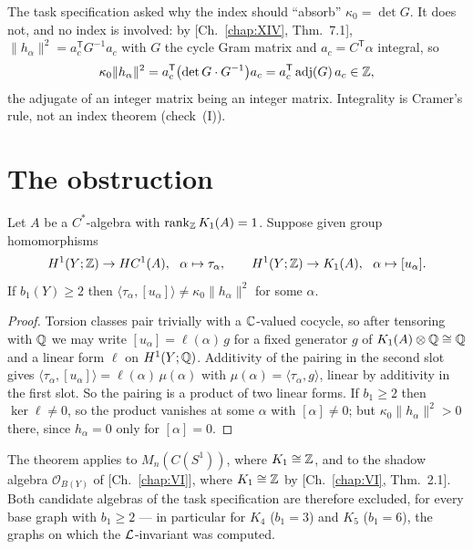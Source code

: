 \begin{remark}\label{XIX:rem:integrality}
The task specification asked why the index should ``absorb'' $\kappa_0=\det G$. It does
not, and no index is involved: by [Ch.~\ref{chap:XIV}, Thm.~7.1], $\|h_\alpha\|^2=a_c^{\mathsf T}G^{-1}a_c$
with $G$ the cycle Gram matrix and $a_c=C^{\mathsf T}\alpha$ integral, so
\[
\kappa_0\|h_\alpha\|^2=a_c^{\mathsf T}\bigl(\det G\cdot G^{-1}\bigr)a_c
=a_c^{\mathsf T}\operatorname{adj}(G)\,a_c\in\mathbb{Z} ,
\]
the adjugate of an integer matrix being an integer matrix. Integrality is Cramer's rule,
not an index theorem (check~(I)).
\end{remark}

\section{The obstruction}\label{XIX:sec:obstruction}

\begin{theorem}
\label{XIX:thm:obstruction}
Let $A$ be a $C^*$-algebra with $\operatorname{rank}_{\mathbb{Z}}K_1(A)=1$. Suppose given group homomorphisms
\[
H^1(Y;\mathbb{Z})\to HC^1(A),\ \ \alpha\mapsto\tau_\alpha,
\qquad
H^1(Y;\mathbb{Z})\to K_1(A),\ \ \alpha\mapsto[u_\alpha].
\]
If $b_1(Y)\ge2$ then $\langle\tau_\alpha,[u_\alpha]\rangle\ne\kappa_0\|h_\alpha\|^2$ for
some $\alpha$.
\end{theorem}

\begin{proof}
Torsion classes pair trivially with a $\mathbb{C}$-valued cocycle, so after tensoring with $\mathbb{Q}$
we may write $[u_\alpha]=\ell(\alpha)\,g$ for a fixed generator $g$ of
$K_1(A)\otimes\mathbb{Q}\cong\mathbb{Q}$ and a linear form $\ell$ on $H^1(Y;\mathbb{Q})$. Additivity of the
pairing in the second slot gives
$\langle\tau_\alpha,[u_\alpha]\rangle=\ell(\alpha)\,\mu(\alpha)$ with
$\mu(\alpha)=\langle\tau_\alpha,g\rangle$, linear by additivity in the first slot. So the
pairing is a product of two linear forms. If $b_1\ge2$ then $\ker\ell\ne0$, so the product
vanishes at some $\alpha$ with $[\alpha]\ne0$; but $\kappa_0\|h_\alpha\|^2>0$ there, since
$h_\alpha=0$ only for $[\alpha]=0$.
\end{proof}

\begin{corollary}\label{XIX:cor:applies}
The theorem applies to $M_n(C(S^1))$, where $K_1\cong\mathbb{Z}$, and to the shadow algebra
$\mathcal O_{B(Y)}$ of [Ch.~\ref{chap:VI}], where $K_1\cong\mathbb{Z}$ by [Ch.~\ref{chap:VI}, Thm.~2.1]. Both candidate
algebras of the task specification are therefore excluded, for every base graph with
$b_1\ge2$ --- in particular for $K_4$ ($b_1=3$) and $K_5$ ($b_1=6$), the graphs on which
the $\mathcal{L}$-invariant was computed.
\end{corollary}

